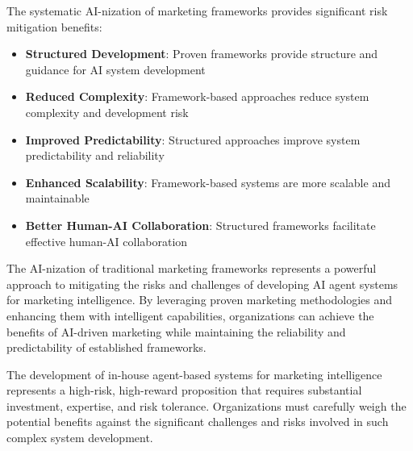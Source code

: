 The systematic AI-nization of marketing frameworks provides significant risk mitigation benefits:

\begin{itemize}
    \item \textbf{Structured Development}: Proven frameworks provide structure and guidance for AI system development
    \item \textbf{Reduced Complexity}: Framework-based approaches reduce system complexity and development risk
    \item \textbf{Improved Predictability}: Structured approaches improve system predictability and reliability
    \item \textbf{Enhanced Scalability}: Framework-based systems are more scalable and maintainable
    \item \textbf{Better Human-AI Collaboration}: Structured frameworks facilitate effective human-AI collaboration
\end{itemize}

The AI-nization of traditional marketing frameworks represents a powerful approach to mitigating the risks and challenges of developing AI agent systems for marketing intelligence. By leveraging proven marketing methodologies and enhancing them with intelligent capabilities, organizations can achieve the benefits of AI-driven marketing while maintaining the reliability and predictability of established frameworks.

The development of in-house agent-based systems for marketing intelligence represents a high-risk, high-reward proposition that requires substantial investment, expertise, and risk tolerance. Organizations must carefully weigh the potential benefits against the significant challenges and risks involved in such complex system development. 
